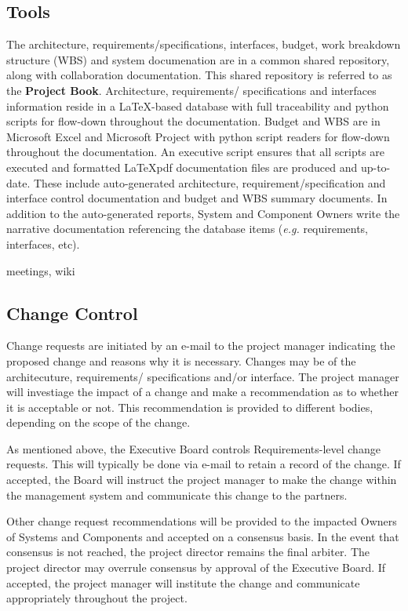 \documentclass[preprint]{aastex}
\begin{document}
\subsection{Tools}
The architecture, requirements/specifications, interfaces, budget, work breakdown structure
(WBS) and system documenation are in a common shared repository, along with collaboration
documentation.  This shared repository is referred to as the \textbf{Project Book}.  Architecture, requirements/ 
specifications and interfaces information reside in a \LaTeX-based database with full traceability
and python scripts for flow-down throughout the documentation.  Budget and WBS are in Microsoft
Excel and Microsoft Project with python script readers for flow-down throughout the documentation.
An executive script ensures that all scripts are executed and formatted \LaTeX pdf documentation
files are produced and up-to-date.  These include auto-generated architecture, requirement/specification 
and interface control documentation and budget and WBS summary documents.  
In addition to the auto-generated reports, System and  Component Owners write the narrative 
documentation referencing the database items ({\em e.g.} requirements, interfaces, etc).

meetings,  wiki

\subsection{Change Control}
Change requests are initiated by an e-mail to the project manager indicating the proposed change
and reasons why it is necessary.  Changes may be of the architecuture, requirements/ specifications
and/or interface.  The project manager will investiage the impact of a change and
make a recommendation as to whether it is acceptable or not.  This recommendation is provided to
different bodies, depending on the scope of the change.

As mentioned above, the Executive Board controls Requirements-level change requests.  This will
typically be done via e-mail to retain a record of the change.  If accepted, the Board will instruct
the project manager to make the change within the management system and communicate this
change to the partners.

Other change request recommendations will be provided to the impacted Owners of Systems and
Components and accepted on a consensus basis.  In the event that consensus is not reached,
the project director remains the final arbiter.  The project director may overrule consensus by
approval of the Executive Board.  If accepted, the project manager will institute the change and
communicate appropriately throughout the project.
\end{document}
